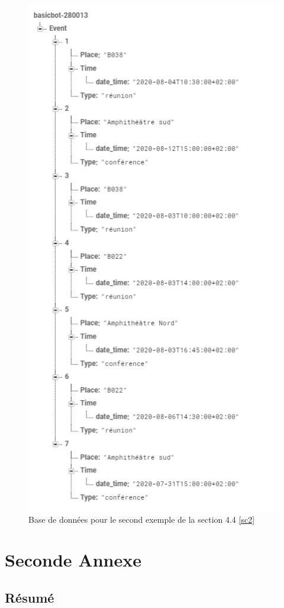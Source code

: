 \documentclass[stage2a]{tnreport} %
\begin{document}
\begin{figure}[H]
    \centering
    \includegraphics{figures/db2.png}
    \caption{Base de données pour le second exemple de la section 4.4 \ref{sc2}}
    \label{db1}
\end{figure}
\chapter{Seconde Annexe}


\cleardoublepage
\thispagestyle{empty}

\section*{Résumé}
\end{document}

